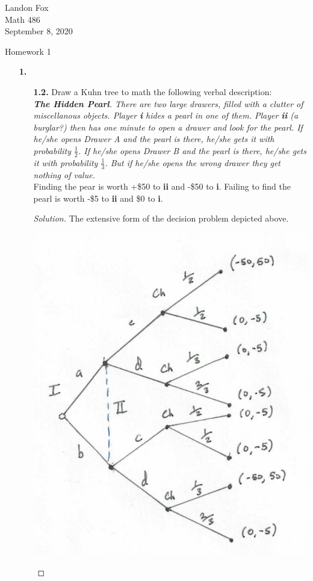 \documentclass[ 12pt ]{article}
\begin{document}
\noindent Landon Fox \\
\noindent Math 486 \\
\noindent September 8, 2020

\begin{center}
\Large Homework 1
\end{center}

\begin{enumerate}
	\item[\textbf{1.}]
		\begin{enumerate}
			\item[\textbf{1.2.}] Draw a Kuhn tree to math the following verbal description: \\
				\textit{\textbf{The Hidden Pearl}. There are two large drawers, filled with a clutter of miscellanous objects. Player \textbf{i} hides a pearl in one of them. Player
					\textbf{ii} (a burglar?) then has one minute to open a drawer and look for the pearl. If he/she opens Drawer A and the pearl is there, he/she gets it with
					probability $\frac{1}{2}$. If he/she opens Drawer B and the pearl is there, he/she gets it with probability $\frac{1}{3}$. But if he/she opens the wrong drawer they
					get nothing of value.} \\
				Finding the pear is worth +\$50 to \textbf{ii} and -\$50 to \textbf{i}. Failing to find the pearl is worth -\$5 to \textbf{ii} and \$0 to \textbf{i}. \\
				\begin{proof}[Solution]
					The extensive form of the decision problem depicted above.
					\begin{center}
						\includegraphics{tree1}
					\end{center}
				\end{proof}
			\newpage



\end{enumerate}
\end{enumerate}
\end{document}
